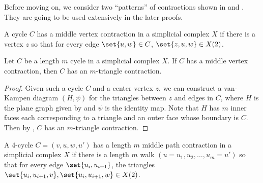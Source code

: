Before moving on, we consider two ``patterns'' of contractions shown in  and . They are going to be used extensively in the later proofs. 

\begin{definition} \label{def:middle-vertex}
    A cycle $C$ has a middle vertex contraction in a simplicial complex \(X\) if there is a vertex \(z\) so that for every edge \(\set{u,w} \in C\), \(\set{z,u,w} \in X(2)\).
\end{definition}

\begin{claim} \label{claim:middle-vertex}
    Let \(C\) be a length \(m\) cycle in a simplicial complex $X$. If $C$ has a middle vertex contraction, then \(C\) has an \(m\)-triangle contraction.
\end{claim}

\begin{proof}
    Given such a cycle $C$ and a center vertex $z$, we can construct a van-Kampen diagram $(H, \psi)$ for the triangles between $z$ and edges in $C$, where $H$ is the plane graph given by  and $\psi$ is the identity map. Note that $H$ has $m$ inner faces each corresponding to a triangle and an outer face whose boundary is $C$. Then by , $C$ has an $m$-triangle contraction.
\end{proof}

\begin{definition} \label{def:middle-path}
    A $4$-cycle \(C=(v,u,w,u')\) has a length $m$ middle path contraction in a simplicial complex \(X\) if there is a length $m$ walk \((u=u_1,u_2,\dots,u_m=u')\) so that for every edge \(\set{u_i,u_{i+1}}\), the triangles \(\set{u_i,u_{i+1},v}, \set{u_i,u_{i+1},w} \in X(2)\). 
\end{definition}

